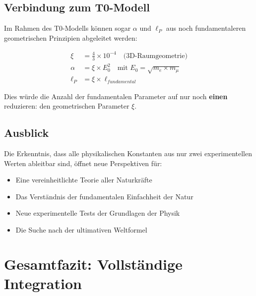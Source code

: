 \documentclass[12pt,a4paper]{article}
\theoremstyle{definition}
\begin{document}
	\subsection{Verbindung zum T0-Modell}
	
	Im Rahmen des T0-Modells k\"onnen sogar $\alpha$ und $\ell_P$ aus noch fundamentaleren geometrischen Prinzipien abgeleitet werden:
	
	\begin{align}
		\xi &= \frac{4}{3} \times 10^{-4} \quad \text{(3D-Raumgeometrie)}\\
		\alpha &= \xi \times E_0^2 \quad \text{mit } E_0 = \sqrt{m_e \times m_\mu}\\
		\ell_P &= \xi \times \ell_{fundamental}
	\end{align}
	
	Dies w\"urde die Anzahl der fundamentalen Parameter auf nur noch \textbf{einen} reduzieren: den geometrischen Parameter $\xi$.
	
	\subsection{Ausblick}
	
	Die Erkenntnis, dass alle physikalischen Konstanten aus nur zwei experimentellen Werten ableitbar sind, \"offnet neue Perspektiven f\"ur:
	
	\begin{itemize}
		\item Eine vereinheitlichte Teorie aller Naturkr\"afte
		\item Das Verst\"andnis der fundamentalen Einfachheit der Natur
		\item Neue experimentelle Tests der Grundlagen der Physik
		\item Die Suche nach der ultimativen Weltformel
	\end{itemize}
	
	\section{Gesamtfazit: Vollst\"andige Integration}
	
\end{document}
